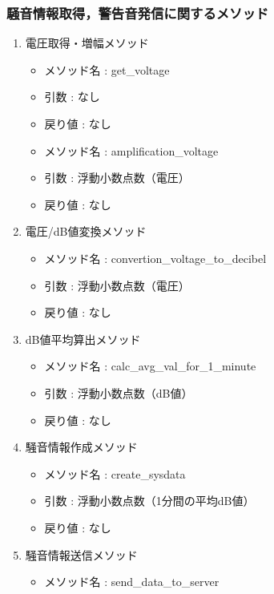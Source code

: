 \subsubsection{騒音情報取得，警告音発信に関するメソッド}
\begin{enumerate}
\renewcommand{\labelenumi}{(\arabic{enumi})}
\item 電圧取得・増幅メソッド
\begin{itemize}
	\item メソッド名 : get\_voltage
	\item 引数 : なし
	\item 戻り値 : なし\\
\end{itemize}
	\begin{itemize}
	\item メソッド名 : amplification\_voltage
	\item 引数 : 浮動小数点数（電圧）
	\item 戻り値 : なし\\
	\end{itemize}
\item 電圧/dB値変換メソッド
	\begin{itemize}
	\item メソッド名 : convertion\_voltage\_to\_decibel
	\item 引数 : 浮動小数点数（電圧）
	\item 戻り値 : なし\\
	\end{itemize}
\item dB値平均算出メソッド
	\begin{itemize}
	\item メソッド名 : calc\_avg\_val\_for\_1\_minute
	\item 引数 : 浮動小数点数（dB値）
	\item 戻り値 : なし\\
	\end{itemize}
\item 騒音情報作成メソッド
	\begin{itemize}
	\item メソッド名 : create\_sysdata
	\item 引数 : 浮動小数点数（1分間の平均dB値）
	\item 戻り値 : なし \\
	\end{itemize}
\item 騒音情報送信メソッド
	\begin{itemize}
	\item メソッド名 : send\_data\_to\_server

\end{itemize}
\end{enumerate}
